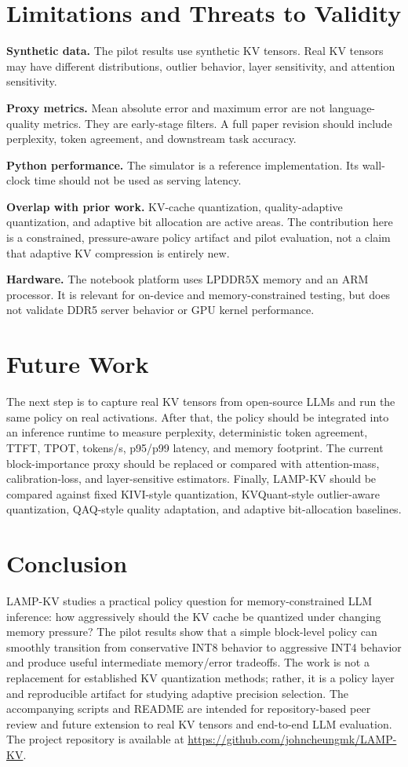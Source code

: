 \documentclass[11pt]{article}
\begin{document}
\section{Limitations and Threats to Validity}
\textbf{Synthetic data.} The pilot results use synthetic KV tensors. Real KV tensors may have different distributions, outlier behavior, layer sensitivity, and attention sensitivity.

\textbf{Proxy metrics.} Mean absolute error and maximum error are not language-quality metrics. They are early-stage filters. A full paper revision should include perplexity, token agreement, and downstream task accuracy.

\textbf{Python performance.} The simulator is a reference implementation. Its wall-clock time should not be used as serving latency.

\textbf{Overlap with prior work.} KV-cache quantization, quality-adaptive quantization, and adaptive bit allocation are active areas. The contribution here is a constrained, pressure-aware policy artifact and pilot evaluation, not a claim that adaptive KV compression is entirely new.

\textbf{Hardware.} The notebook platform uses LPDDR5X memory and an ARM processor. It is relevant for on-device and memory-constrained testing, but does not validate DDR5 server behavior or GPU kernel performance.

\section{Future Work}
The next step is to capture real KV tensors from open-source LLMs and run the same policy on real activations. After that, the policy should be integrated into an inference runtime to measure perplexity, deterministic token agreement, TTFT, TPOT, tokens/s, p95/p99 latency, and memory footprint. The current block-importance proxy should be replaced or compared with attention-mass, calibration-loss, and layer-sensitive estimators. Finally, LAMP-KV should be compared against fixed KIVI-style quantization, KVQuant-style outlier-aware quantization, QAQ-style quality adaptation, and adaptive bit-allocation baselines.

\section{Conclusion}
LAMP-KV studies a practical policy question for memory-constrained LLM inference: how aggressively should the KV cache be quantized under changing memory pressure? The pilot results show that a simple block-level policy can smoothly transition from conservative INT8 behavior to aggressive INT4 behavior and produce useful intermediate memory/error tradeoffs. The work is not a replacement for established KV quantization methods; rather, it is a policy layer and reproducible artifact for studying adaptive precision selection. The accompanying scripts and README are intended for repository-based peer review and future extension to real KV tensors and end-to-end LLM evaluation. The project repository is available at \url{https://github.com/johncheungmk/LAMP-KV}.
\end{document}
